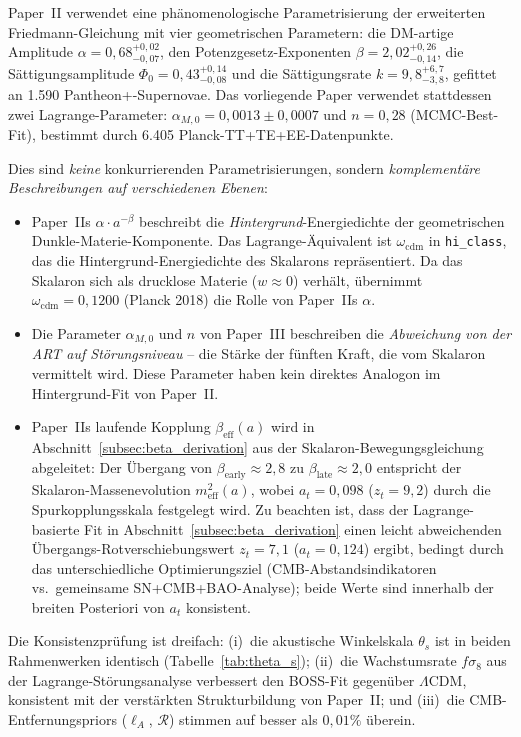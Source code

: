 \documentclass[11pt,a4paper]{article}
\begin{document}
Paper~II verwendet eine ph\"anomenologische Parametrisierung der erweiterten Friedmann-Gleichung mit vier geometrischen Parametern: die DM-artige Amplitude $\alpha = 0{,}68^{+0{,}02}_{-0{,}07}$, den Potenzgesetz-Exponenten $\beta = 2{,}02^{+0{,}26}_{-0{,}14}$, die S\"attigungsamplitude $\Phi_0 = 0{,}43^{+0{,}14}_{-0{,}08}$ und die S\"attigungsrate $k = 9{,}8^{+6{,}7}_{-3{,}8}$, gefittet an 1.590 Pantheon+-Supernovae. Das vorliegende Paper verwendet stattdessen zwei Lagrange-Parameter: $\alpha_{M,0} = 0{,}0013 \pm 0{,}0007$ und $n = 0{,}28$ (MCMC-Best-Fit), bestimmt durch 6.405 Planck-TT+TE+EE-Datenpunkte.

Dies sind \textit{keine} konkurrierenden Parametrisierungen, sondern \textit{komplement\"are Beschreibungen auf verschiedenen Ebenen}:
\begin{itemize}
\item Paper~IIs $\alpha \cdot a^{-\beta}$ beschreibt die \textit{Hintergrund}-Energiedichte der geometrischen Dunkle-Materie-Komponente. Das Lagrange-\"Aquivalent ist $\omega_{\mathrm{cdm}}$ in \texttt{hi\_class}, das die Hintergrund-Energiedichte des Skalarons repr\"asentiert. Da das Skalaron sich als drucklose Materie ($w \approx 0$) verh\"alt, \"ubernimmt $\omega_{\mathrm{cdm}} = 0{,}1200$ (Planck 2018) die Rolle von Paper~IIs $\alpha$.
\item Die Parameter $\alpha_{M,0}$ und $n$ von Paper~III beschreiben die \textit{Abweichung von der ART auf St\"orungsniveau} -- die St\"arke der f\"unften Kraft, die vom Skalaron vermittelt wird. Diese Parameter haben kein direktes Analogon im Hintergrund-Fit von Paper~II.
\item Paper~IIs laufende Kopplung $\beta_{\mathrm{eff}}(a)$ wird in Abschnitt~\ref{subsec:beta_derivation} aus der Skalaron-Bewegungsgleichung abgeleitet: Der \"Ubergang von $\beta_{\mathrm{early}} \approx 2{,}8$ zu $\beta_{\mathrm{late}} \approx 2{,}0$ entspricht der Skalaron-Massenevolution $m_{\mathrm{eff}}^2(a)$, wobei $a_t = 0{,}098$ ($z_t = 9{,}2$) durch die Spurkopplungsskala festgelegt wird. Zu beachten ist, dass der Lagrange-basierte Fit in Abschnitt~\ref{subsec:beta_derivation} einen leicht abweichenden \"Ubergangs-Rotverschiebungswert $z_t = 7{,}1$ ($a_t = 0{,}124$) ergibt, bedingt durch das unterschiedliche Optimierungsziel (CMB-Abstandsindikatoren vs.\ gemeinsame SN+CMB+BAO-Analyse); beide Werte sind innerhalb der breiten Posteriori von $a_t$ konsistent.
\end{itemize}

Die Konsistenzpr\"ufung ist dreifach: (i)~die akustische Winkelskala $\theta_s$ ist in beiden Rahmenwerken identisch (Tabelle~\ref{tab:theta_s}); (ii)~die Wachstumsrate $f\sigma_8$ aus der Lagrange-St\"orungsanalyse verbessert den BOSS-Fit gegen\"uber $\Lambda$CDM, konsistent mit der verst\"arkten Strukturbildung von Paper~II; und (iii)~die CMB-Entfernungspriors ($\ell_A$, $\mathcal{R}$) stimmen auf besser als $0{,}01\%$ \"uberein.
\end{document}
